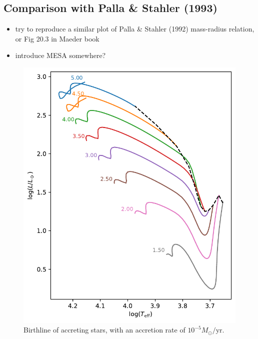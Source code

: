 \documentclass[12pt,a4paper]{article}
\newcommand{\mr}{\mathrm}
\newenvironment{outline}[1]{%
  \begin{itemize}[label=\textbullet]%
  \color{#1}%
}{%
  \end{itemize}%
}
\begin{document}
\subsection{Comparison with Palla \& Stahler (1993)}
\label{sec:comp_palla_stahler}

\begin{outline}{gray}
  \item try to reproduce a similar plot of Palla \& Stahler (1992) mass-radius relation, or Fig 20.3 in Maeder book
  \item introduce MESA somewhere?
\end{outline}

\begin{figure}
  \centering  
  \includegraphics[width=.65\textwidth,keepaspectratio]{birthline_acce5.pdf}
  \caption{Birthline of accreting stars, with an accretion rate of $10^{-5} M_\odot/\mr{yr}$.} \label{fig:birthline_acce5}
\end{figure}



\end{document}
